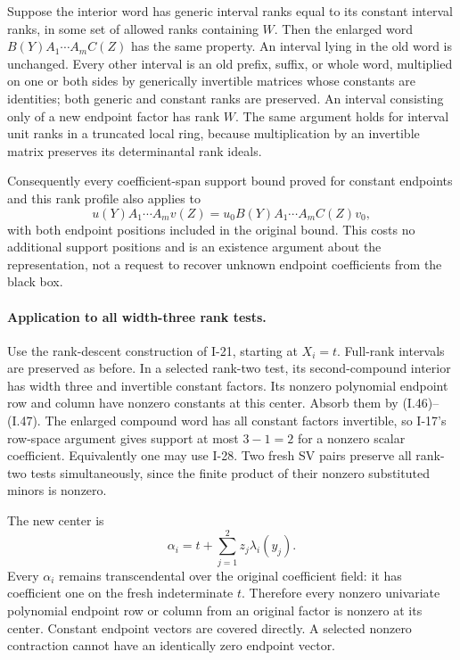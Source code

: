 Suppose the interior word has generic interval ranks equal
to its constant interval ranks, in some set of allowed ranks
containing $W$.  Then the enlarged word
$B(Y)A_1\cdots A_m C(Z)$ has the same property.  An interval
lying in the old word is unchanged.  Every other interval is
an old prefix, suffix, or whole word, multiplied on one or
both sides by generically invertible matrices whose constants
are identities; both generic and constant ranks are preserved.
An interval consisting only of a new endpoint factor has
rank $W$.  The same argument holds for interval unit ranks
in a truncated local ring, because multiplication by an
invertible matrix preserves its determinantal rank ideals.

Consequently every coefficient-span support bound proved for
constant endpoints and this rank profile also applies to
\[
 u(Y)A_1\cdots A_m v(Z)
      =u_0B(Y)A_1\cdots A_m C(Z)v_0,
\]
with both endpoint positions included in the original bound.
This costs no additional support positions and is an
existence argument about the representation, not a request
to recover unknown endpoint coefficients from the black box.

\paragraph{Application to all width-three rank tests.}
Use the rank-descent construction of I-21, starting at
$X_i=t$.  Full-rank intervals are preserved as before.
In a selected rank-two test, its second-compound interior
has width three and invertible constant factors.  Its
nonzero polynomial endpoint row and column have nonzero
constants at this center.  Absorb them by (I.46)--(I.47).
The enlarged compound word has all constant factors
invertible, so I-17's row-space argument gives support at
most $3-1=2$ for a nonzero scalar coefficient.  Equivalently
one may use I-28.  Two fresh SV pairs preserve all rank-two
tests simultaneously, since the finite product of their
nonzero substituted minors is nonzero.

The new center is
\[
 \alpha_i=t+\sum_{j=1}^2z_j\lambda_i(y_j).
\]
Every $\alpha_i$ remains transcendental over the original
coefficient field: it has coefficient one on the fresh
indeterminate $t$.  Therefore every nonzero univariate
polynomial endpoint row or column from an original factor
is nonzero at its center.  Constant endpoint vectors are
covered directly.  A selected nonzero contraction cannot
have an identically zero endpoint vector.

